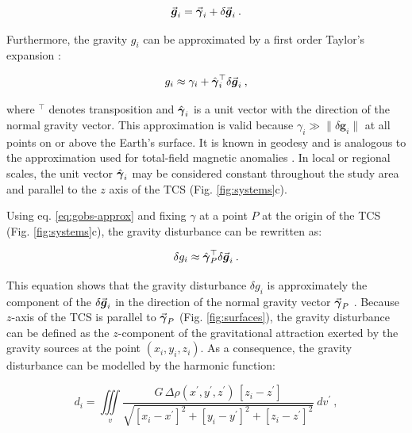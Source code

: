 \documentclass[extra]{gji}
\newcommand{\versor}[1]{\hat{\mitbf{#1}}}
\renewcommand{\vector}[1]{\vec{\mitbf{#1}}}
\begin{document}
\begin{equation}
\vector{g}_i = \vector{\gamma}_i + \delta \vector{g}_i \: .
\label{eq:gravity-vector-TCS}
\end{equation}

\noindent
Furthermore, the gravity $g_i$ can be approximated by a first order Taylor's
expansion \citep{sanso_sideris2013}:

\begin{equation}
g_i \approx \gamma_i +
\versor{\gamma}_i^{\top} \delta \vector{g}_i \: ,
\label{eq:gobs-approx}
\end{equation}

\noindent
where $^{\top}$ denotes transposition and $\versor{\gamma}_{i}$ is a unit
vector with the direction of the normal gravity vector.
This approximation is valid because
$\gamma_{i} \gg \| \delta \mathbf{g}_{i} \|$ at all points on or above the
Earth's surface.
It is known in geodesy \citep[e.g.,][]{sanso_sideris2013}
and is analogous to the approximation used for
total-field magnetic anomalies \citep[e.g.,][]{blakely1996}.
In local or regional scales, the unit
vector $\versor{\gamma}_{i}$
may be considered constant throughout the study area and
parallel to the $z$ axis of the TCS (Fig. \ref{fig:systems}c).

Using eq. \ref{eq:gobs-approx} and fixing $\gamma$ at a point $P$ at
the origin of the TCS (Fig. \ref{fig:systems}c),
the gravity disturbance can be rewritten as:

\begin{equation}
\delta g_{i} \approx \versor{\gamma}_{P}^{\top} \delta \vector{g}_{i} \: .
\label{eq:gravity-disturbance-approx-TCS}
\end{equation}

\noindent
This equation shows that the gravity disturbance $\delta g_{i}$ is
approximately the component of the $\delta \vector{g}_{i}$ in the direction of
the normal gravity vector $\vector{\gamma}_P$
\citep{hofmann-wellenhof-moritz2005, sanso_sideris2013}.
Because $z$-axis of the TCS is parallel to $\vector{\gamma}_P$
(Fig. \ref{fig:surfaces}), the gravity disturbance can be defined as the
$z$-component of the gravitational attraction exerted by the gravity sources at
the point $(x_{i}, y_{i}, z_{i})$.
As a consequence, the gravity disturbance can be modelled by the harmonic
function:

\begin{equation}
d_{i} = \iiint\limits_{v}
\frac{G \, \Delta\rho(x^{\prime}, y^{\prime}, z^{\prime}) \,
[z_{i} - z^{\prime}]}
{\sqrt{[x_{i} - x^{\prime}]^{2} +
[y_{i} - y^{\prime}]^{2} + [z_{i} - z^{\prime}]^{2}}} \: dv^{\prime} \: ,
\label{eq:gz-local}
\end{equation}
\end{document}
